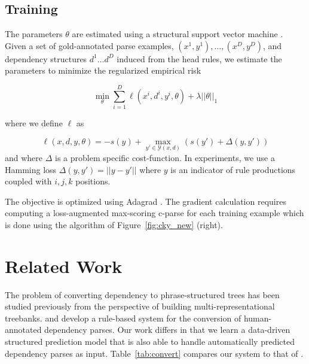 \documentclass[11pt,letterpaper]{article}
\begin{document}
\subsection{Training}

The parameters $\theta$ are estimated using a structural support
vector machine \cite{taskar-04}.
Given a set of gold-annotated parse examples, $(x^{1}, y^{1}), \ldots,
(x^{D}, y^{D})$, and dependency structures $d^{1} \ldots d^{D}$ induced
from the head rules, we estimate the
parameters to minimize the regularized empirical risk

\[ \min_{\theta} \sum_{i = 1}^D  \ell( x^{i}, d^{i} , y^{i}, \theta)  + \lambda ||\theta||_1 \]

\noindent where we define $\ell$ as

\[\ell(x, d, y, \theta) = - s(y) + \max_{y' \in \mathcal{Y}(x, d)}\left(s(y')  + \Delta(y, y') \right) \]
\noindent and where $\Delta$ is a problem specific cost-function.
In experiments, we use a Hamming loss  $\Delta(y, y') = || y -y'||$ where $y$ is an indicator
of rule productions coupled with $i, j, k$ positions.

The objective is optimized using Adagrad \cite{duchi2011adaptive}.  The gradient
calculation requires computing a loss-augmented max-scoring c-parse for each
training example which is done using the algorithm of
Figure~\ref{fig:cky_new} (right).


\section{Related Work}

The problem of converting dependency to phrase-structured trees has
been studied previously from the perspective of building
multi-representational treebanks.   and
 develop a rule-based system for the
conversion of human-annotated dependency parses. Our work differs in that
we learn a data-driven structured prediction model that is also able
to handle automatically predicted dependency parses as input. Table~\ref{tab:convert} compares
our system to that of .
\end{document}
